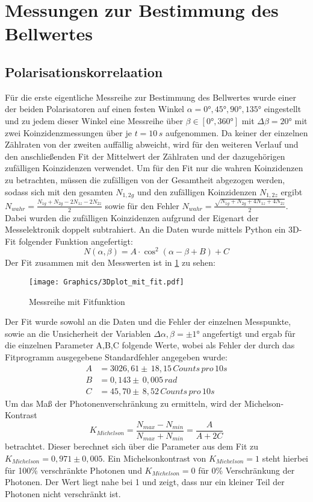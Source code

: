 \documentclass[twoside,colorback,accentcolor=tud4c,11pt]{tudreport}
\begin{document}
\section{Messungen zur Bestimmung des Bellwertes}
\subsection{Polarisationskorrelaation}
Für die erste eigentliche Messreihe zur Bestimmung des Bellwertes wurde einer der beiden Polarisatoren auf einen festen Winkel $\alpha=0°,45°,90°,135°$ eingestellt und zu jedem dieser Winkel eine Messreihe über $\beta\in[0°,360°]$ mit $\Delta\beta=20°$ mit zwei Koinzidenzmessungen über je $t=10\,\si{s}$ aufgenommen. Da keiner der einzelnen Zählraten von der zweiten auffällig abweicht, wird für den weiteren Verlauf und den anschließenden Fit der Mittelwert der Zählraten und der dazugehörigen zufälligen Koinzidenzen verwendet.
Um für den Fit nur die wahren Koinzidenzen zu betrachten, müssen die zufälligen von der Gesamtheit abgezogen werden, sodass sich mit den gesamten $N_{1,2g}$ und den zufälligen Koinzidenzen $N_{1,2z}$ ergibt $N_{wahr}=\frac{N_{1g}+N_{2g}-2N_{1z}-2N_{2z}}{2}$ sowie für den Fehler $N_{wahr}=\frac{\sqrt{N_{1g}+N_{2g}+4N_{1z}+4N_{2z}}}{2}$. Dabei wurden die zufälligen Koinzidenzen aufgrund der Eigenart der Messelektronik doppelt subtrahiert. An die Daten wurde mittels Python ein 3D-Fit folgender Funktion angefertigt:
\begin{equation}\label{eq:fitfunc}
N(\alpha,\beta)=A\cdot\cos^2(\alpha-\beta+B)+C
\end{equation}
Der Fit zusammen mit den Messwerten ist in \ref{3dfit} zu sehen:
\begin{figure}[H]
\centering
   	\begin{minipage}[b]{1.0\textwidth}
   	\texttt{[image: Graphics/3Dplot\_mit\_fit.pdf]}
   	\caption{Messreihe mit Fitfunktion}
  	\label{3dfit}
   	\end{minipage}
\end{figure}
Der Fit wurde sowohl an die Daten und die Fehler der einzelnen Messpunkte, sowie an die Unsicherheit der Variablen $\Delta\alpha,\beta=\pm1°$ angefertigt und ergab für die einzelnen Parameter A,B,C folgende Werte, wobei als Fehler der durch das Fitprogramm ausgegebene Standardfehler angegeben wurde:
\begin{align}
A&=3026,61\pm\,18,15\,\si{Counts\,pro\,10s} \\
B&=0,143\pm\,0,005\,\si{rad} \\
C&=45,70\pm\,8,52\,\si{Counts\,pro\,10s}
\end{align}
Um das Maß der Photonenverschränkung zu ermitteln, wird der Michelson-Kontrast 
\begin{equation}
K_{Michelson}=\frac{N_{max}-N_{min}}{N_{max}+N_{min}}=\frac{A}{A+2C}
\end{equation}
betrachtet. Dieser berechnet sich über die Parameter aus dem Fit zu $K_{Michelson}=0,971\pm0,005$. Ein Michelsonkontrast von $K_{Michelson}=1$ steht hierbei für 100\% verschränkte Photonen und $K_{Michelson}=0$ für 0\% Verschränkung der Photonen. Der Wert liegt nahe bei 1 und zeigt, dass nur ein kleiner Teil der Photonen nicht verschränkt ist.
\end{document}

